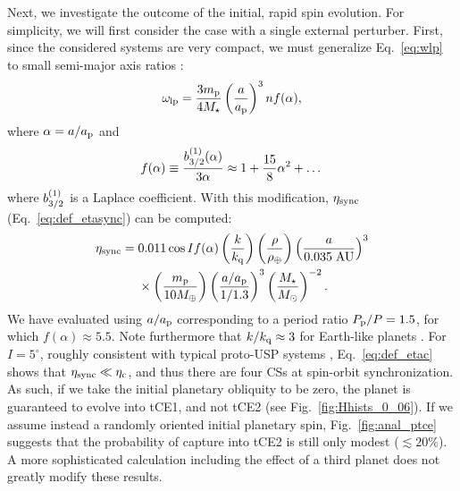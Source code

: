 \documentclass[
        fleqn,
        usenatbib,
    ]{mnras}
\newcommand*{\p}[1]{\left(#1\right)}
\begin{document}
Next, we investigate the outcome of the initial, rapid spin evolution. For
simplicity, we will first consider the case with a single external perturber.
First, since the considered systems are very compact, we must generalize
Eq.~\eqref{eq:wlp} to small semi-major axis ratios \citep[see e.g.][]{lai_2017}:
\begin{equation}
    \omega_{\rm lp} = \frac{3m_{\rm p}}{4M_{\star}}
        \p{\frac{a}{a_{\rm p}}}^3 n f(\alpha),
        \label{eq:def_g_usp}
\end{equation}
where $\alpha = a / a_{\rm p}$ and
\begin{equation}
    f(\alpha) \equiv \frac{b_{\rm 3/2}^{(1)}(\alpha)}{3\alpha}
        \approx 1 + \frac{15}{8}\alpha^2 + \dots
\end{equation}
where $b_{\rm 3/2}^{(1)}$ is a Laplace coefficient. With this modification,
$\eta_{\rm sync}$ (Eq.~\ref{eq:def_etasync}) can be computed:
\begin{align}
    \eta_{\rm sync} ={}& 0.011 \cos I f(\alpha)
            \p{\frac{k}{k_{\rm q}}}
            \p{\frac{\rho}{\rho_{\oplus}}}
            \p{\frac{a}{0.035 \;\mathrm{AU}}}^{3}\nonumber\\
        &\times
            \p{\frac{m_{\rm p}}{10 M_{\oplus}}}
            \p{\frac{a / a_{\rm p}}{1/1.3}}^{3}
            \p{\frac{M_\star}{M_{\odot}}}^{-2}
            .\label{eq:etasync_usp}
\end{align}
We have evaluated using $a / a_{\rm p}$ corresponding to a period ratio $P_{\rm
p} / P = 1.5$, for which $f(\alpha) \approx 5.5$. Note furthermore that $k /
k_{\rm q} \approx 3$ for Earth-like planets \citep{groten2004fundamental,
lainey2016quantification}. For $I = 5^\circ$, roughly
consistent with typical proto-USP systems \citep{dai2018larger},
Eq.~\eqref{eq:def_etac} shows that $\eta_{\rm sync} \ll \eta_{\rm c}$, and thus
there are four CSs at spin-orbit synchronization. As such, if we take the
initial planetary obliquity to be zero, the planet is guaranteed to evolve into
tCE1, and not tCE2 (see Fig.~\ref{fig:Hhists_0_06}). If we assume instead a
randomly oriented initial planetary spin, Fig.~\ref{fig:anal_ptce} suggests that
the probability of capture into tCE2 is still only modest ($\lesssim 20\%$). A
more sophisticated calculation including the effect of a third planet does not
greatly modify these results.
\end{document}
